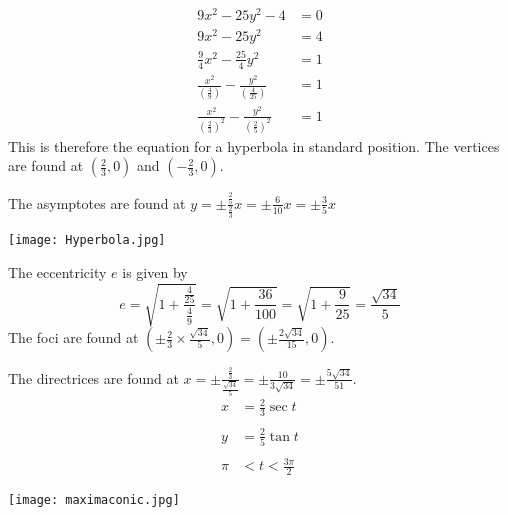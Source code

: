 \documentclass[a4paper,12pt]{article}
\numberwithin{equation}{section}
\begin{document}
\begin{question}
\qpart
\qsubpart
\begin{align*}
9x^2-25y^2-4&=0\\
9x^2-25y^2&=4\\
\frac{9}{4}x^2-\frac{25}{4}y^2&=1\\
\frac{x^2}{(\frac{4}{9})}-\frac{y^2}{(\frac{4}{25})}&=1\\
\frac{x^2}{(\frac{2}{3})^2}-\frac{y^2}{(\frac{2}{5})^2}&=1
\end{align*}
This is therefore the equation for a hyperbola in standard position.
\qsubpart
The vertices are found at $(\frac{2}{3},0)$ and $(-\frac{2}{3},0)$.

The asymptotes are found at $y=\pm\frac{\frac{2}{5}}{\frac{2}{3}}x=\pm\frac{6}{10}x=\pm\frac{3}{5}x$
\qsubpart
\begin{center}
\texttt{[image: Hyperbola.jpg]}
\end{center}
\qsubpart
The eccentricity $e$ is given by
\[e=\sqrt{1+\frac{\frac{4}{25}}{\frac{4}{9}}}=\sqrt{1+\frac{36}{100}}=\sqrt{1+\frac{9}{25}}=\frac{\sqrt{34}}{5}\]
The foci are found at $(\pm\frac{2}{3}\times\frac{\sqrt{34}}{5},0)=(\pm\frac{2\sqrt{34}}{15},0)$.

The directrices are found at $x=\pm\frac{\frac{2}{3}}{\frac{\sqrt{34}}{5}}=\pm\frac{10}{3\sqrt{34}}=\pm\frac{5\sqrt{34}}{51}$.
\qsubpart
\begin{align*}
x&=\frac{2}{3}\sec{t}\\
\\
y&=\frac{2}{5}\tan{t}\\
\\
\pi&<t<\frac{3\pi}{2}
\end{align*}
\qpart
\begin{center}
\texttt{[image: maximaconic.jpg]}
\end{center}
\end{question}
\newpage
\end{document}
